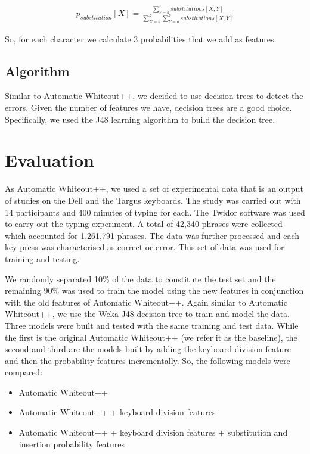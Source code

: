 \documentclass[letterpaper, 10 pt, conference]{ieeeconf}  %
\begin{document}
\begin{align*}
p_{substitution}[X] = \frac{\sum\limits_{Y=a}^{z} substitutions[X,Y]}{\sum\limits_{X=a}^{z} \sum\limits_{Y=a}^{z}substitutions[X,Y]}
\end{align*}

So, for each character we calculate 3 probabilities that we add as features.

\subsection{Algorithm}

Similar to Automatic Whiteout++, we decided to use decision trees to detect the errors. Given the number of features we have, decision trees are a good choice. Specifically, we used the J48 learning algorithm to build the decision tree.

\section{Evaluation}

As Automatic Whiteout++, we used a set of experimental data that is an output of studies on the Dell and the Targus keyboards. The study was carried out with 14 participants and 400 minutes of typing for each. The Twidor software was used to carry out the typing experiment. A total of 42,340 phrases were collected which accounted for 1,261,791 phrases. The data was further processed and each key press was characterised as correct or error. This set of data was used for training and testing.

We randomly separated 10\% of the data to constitute the test set and the remaining 90\% was used to train the model using the new features in conjunction with the old features of Automatic Whiteout++. Again similar to Automatic Whiteout++, we use the Weka J48 decision tree to train and model the data. Three models were built and tested with the same training and test data. While the first is the original Automatic Whiteout++ (we refer it as the baseline), the second and third are the models built by adding the keyboard division feature and then the probability features incrementally. So, the following models were compared:
\begin{itemize}
\item Automatic Whiteout++
\item Automatic Whiteout++ + keyboard division features
\item Automatic Whiteout++ + keyboard division features + substitution and insertion probability features
\end{itemize}
\end{document}
